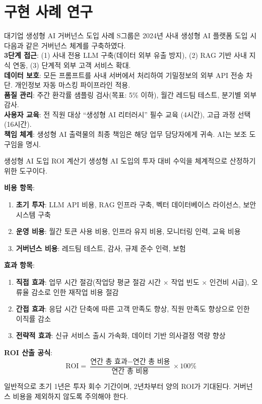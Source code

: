 \section{구현 사례 연구}
\label{sec:gen.5}

\begin{practicaltool}{대기업 생성형 AI 거버넌스 도입 사례}
S그룹은 2024년 사내 생성형 AI 플랫폼 도입 시 다음과 같은 거버넌스 체계를 구축하였다.\\
\textbf{3단계 접근}: (1) 사내 전용 LLM 구축(데이터 외부 유출 방지), (2) RAG 기반 사내 지식 연동, (3) 단계적 외부 고객 서비스 확대.\\
\textbf{데이터 보호}: 모든 프롬프트를 사내 서버에서 처리하여 기밀정보의 외부 API 전송 차단. 개인정보 자동 마스킹 파이프라인 적용.\\
\textbf{품질 관리}: 주간 환각률 샘플링 검사(목표: 5\% 이하), 월간 레드팀 테스트, 분기별 외부 감사.\\
\textbf{사용자 교육}: 전 직원 대상 ``생성형 AI 리터러시'' 필수 교육 (4시간), 고급 과정 선택 (16시간).\\
\textbf{책임 체계}: 생성형 AI 출력물의 최종 책임은 해당 업무 담당자에게 귀속. AI는 보조 도구임을 명시.
\end{practicaltool}

\begin{practicaltool}{생성형 AI 도입 ROI 계산기}
생성형 AI 도입의 투자 대비 수익을 체계적으로 산정하기 위한 도구이다.

\textbf{비용 항목}:
\begin{enumerate}
 \item \textbf{초기 투자}: LLM API 비용, RAG 인프라 구축, 벡터 데이터베이스 라이선스, 보안 시스템 구축
 \item \textbf{운영 비용}: 월간 토큰 사용 비용, 인프라 유지 비용, 모니터링 인력, 교육 비용
 \item \textbf{거버넌스 비용}: 레드팀 테스트, 감사, 규제 준수 인력, 보험
\end{enumerate}

\textbf{효과 항목}:
\begin{enumerate}
 \item \textbf{직접 효과}: 업무 시간 절감(작업당 평균 절감 시간 $\times$ 작업 빈도 $\times$ 인건비 시급), 오류율 감소로 인한 재작업 비용 절감
 \item \textbf{간접 효과}: 응답 시간 단축에 따른 고객 만족도 향상, 직원 만족도 향상으로 인한 이직률 감소
 \item \textbf{전략적 효과}: 신규 서비스 출시 가속화, 데이터 기반 의사결정 역량 향상
\end{enumerate}

\textbf{ROI 산출 공식}:
\[
\text{ROI} = \frac{\text{연간 총 효과} - \text{연간 총 비용}}{\text{연간 총 비용}} \times 100\%
\]

일반적으로 초기 1년은 투자 회수 기간이며, 2년차부터 양의 ROI가 기대된다. 거버넌스 비용을 제외하지 않도록 주의해야 한다.
\end{practicaltool}

